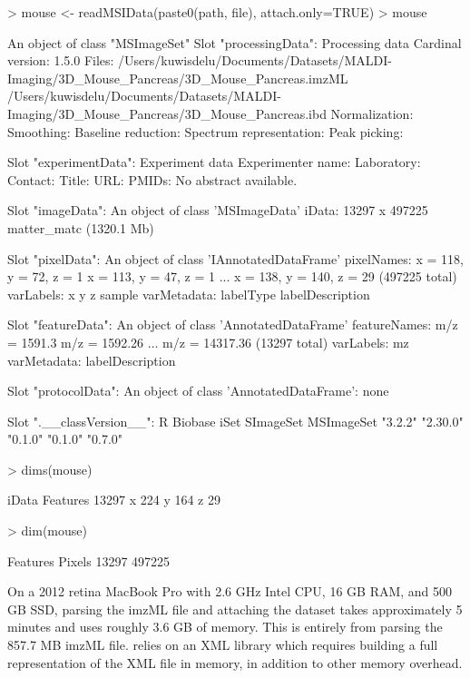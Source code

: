 \documentclass[a4paper]{article}
\begin{document}
\begin{Schunk}
\begin{Sinput}
> mouse <- readMSIData(paste0(path, file), attach.only=TRUE)
> mouse
\end{Sinput}
\begin{Soutput}
An object of class "MSImageSet"
Slot "processingData":
Processing data
  Cardinal version: 1.5.0 
  Files: /Users/kuwisdelu/Documents/Datasets/MALDI-Imaging/3D_Mouse_Pancreas/3D_Mouse_Pancreas.imzML
         /Users/kuwisdelu/Documents/Datasets/MALDI-Imaging/3D_Mouse_Pancreas/3D_Mouse_Pancreas.ibd 
  Normalization:  
  Smoothing:  
  Baseline reduction:  
  Spectrum representation:  
  Peak picking:  

Slot "experimentData":
Experiment data
  Experimenter name:  
  Laboratory:  
  Contact:  
  Title:  
  URL:  
  PMIDs:  
  No abstract available.

Slot "imageData":
An object of class 'MSImageData'
  iData: 13297 x 497225 matter_matc (1320.1 Mb)

Slot "pixelData":
An object of class 'IAnnotatedDataFrame'
  pixelNames: x = 118, y = 72, z = 1 x = 113, y = 47, z = 1 ... x = 138, y = 140, z = 29
    (497225 total)
  varLabels: x y z sample
  varMetadata: labelType labelDescription

Slot "featureData":
An object of class 'AnnotatedDataFrame'
  featureNames: m/z = 1591.3 m/z = 1592.26 ... m/z = 14317.36 (13297 total)
  varLabels: mz
  varMetadata: labelDescription

Slot "protocolData":
An object of class 'AnnotatedDataFrame': none

Slot ".__classVersion__":
         R    Biobase       iSet  SImageSet MSImageSet 
   "3.2.2"   "2.30.0"    "0.1.0"    "0.1.0"    "0.7.0" 
\end{Soutput}
\begin{Sinput}
> dims(mouse)
\end{Sinput}
\begin{Soutput}
         iData
Features 13297
x          224
y          164
z           29
\end{Soutput}
\begin{Sinput}
> dim(mouse)
\end{Sinput}
\begin{Soutput}
Features   Pixels 
   13297   497225 
\end{Soutput}
\end{Schunk}

On a 2012 retina MacBook Pro with 2.6 GHz Intel CPU, 16 GB RAM, and 500 GB SSD, parsing the imzML file and attaching the dataset takes approximately 5 minutes and uses roughly 3.6 GB of memory. This is entirely from parsing the 857.7 MB imzML file.  relies on an XML library which requires building a full representation of the XML file in memory, in addition to other memory overhead.
\end{document}
